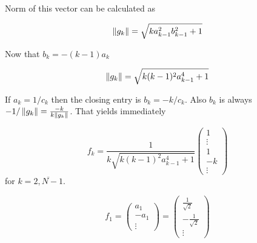 \documentclass{article}
\begin{document}
Norm of this vector can be calculated as

\providecommand{\fknorm}{\sqrt{k a_{k-1}^2 b_{k-1}^2 + 1}}
$$\norm{g_k} = \fknorm$$

Now that $b_k = -(k-1)a_k$

\renewcommand{\fknorm}{\sqrt{k(k-1)^2 a_{k-1}^4 + 1}}
$$\norm{g_k} = \fknorm$$

If $a_k = 1/c_k$ then the closing entry is $b_k = -k/c_k$.
Also $b_k$ is always $-1/\left\|{g_k}\right\| = \frac{-k}{k\left\|{g_k}\right\|}$.
That yields immediately

$$f_k =
\frac{1}{k\fknorm}
\begin{pmatrix}1 \\ \vdots \\ 1 \\ -k \\ \vdots\end{pmatrix}$$
    for $k=\overline{2,N-1}$.

$$f_1
    = \begin{pmatrix}a_1 \\ -a_1 \\ \vdots \end{pmatrix}
        = \begin{pmatrix}\frac1{\sqrt2} \\ - \frac{1}{\sqrt2} \\ \vdots \end{pmatrix}
            $$

\end{document}
